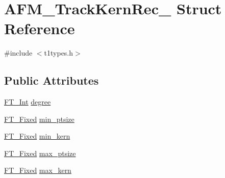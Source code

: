 \hypertarget{struct_a_f_m___track_kern_rec__}{\section{A\-F\-M\-\_\-\-Track\-Kern\-Rec\-\_\- Struct Reference}
\label{struct_a_f_m___track_kern_rec__}
}


{\ttfamily \#include $<$t1types.\-h$>$}

\subsection*{Public Attributes}
\begin{DoxyCompactItemize}
\item 
\hyperlink{fttypes_8h_af90e5fb0d07e21be9fe6faa33f02484c}{F\-T\-\_\-\-Int} \hyperlink{struct_a_f_m___track_kern_rec___a15272593c1a0ea05ca3687e7c2de26b6}{degree}
\item 
\hyperlink{fttypes_8h_a5f5a679cc09f758efdd0d1c5feed3c3d}{F\-T\-\_\-\-Fixed} \hyperlink{struct_a_f_m___track_kern_rec___a7b1e7fd74d92dcf2b89fee7f74d4fdba}{min\-\_\-ptsize}
\item 
\hyperlink{fttypes_8h_a5f5a679cc09f758efdd0d1c5feed3c3d}{F\-T\-\_\-\-Fixed} \hyperlink{struct_a_f_m___track_kern_rec___aee6f40c722e14ee2fb17948ce19d0499}{min\-\_\-kern}
\item 
\hyperlink{fttypes_8h_a5f5a679cc09f758efdd0d1c5feed3c3d}{F\-T\-\_\-\-Fixed} \hyperlink{struct_a_f_m___track_kern_rec___a2b22a268fb0654a035ec59d3dfa3dfa4}{max\-\_\-ptsize}
\item 
\hyperlink{fttypes_8h_a5f5a679cc09f758efdd0d1c5feed3c3d}{F\-T\-\_\-\-Fixed} \hyperlink{struct_a_f_m___track_kern_rec___a8e25a36b738a2de3fa5c08e477b5a6a2}{max\-\_\-kern}
\end{DoxyCompactItemize}



